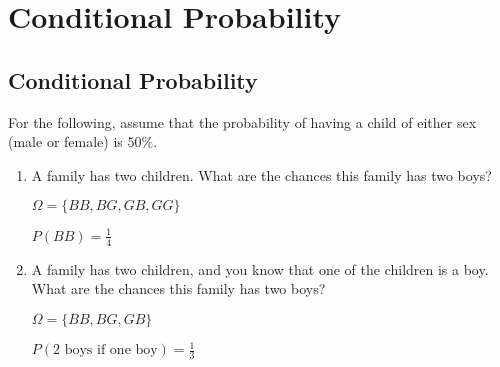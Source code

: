 \chapter{Conditional Probability}

\section{Conditional Probability}

\begin{example}
    For the following, assume that the probability of having a child of either sex (male or female) is $50\%$.

    \begin{enumerate}[label=\alph*)]
        \item A family has two children. What are the chances this family has two boys? 

        $\Omega = \{ BB, BG, GB, GG \}$

        $P(BB) = \frac{1}{4}$

        \item A family has two children, and you know that one of the children is a boy. What are the chances this family has two boys?
        
        $\Omega = \{ BB, BG, GB \}$

        $P(\text{2 boys if one boy}) = \frac{1}{3}$
    \end{enumerate}
\end{example}

